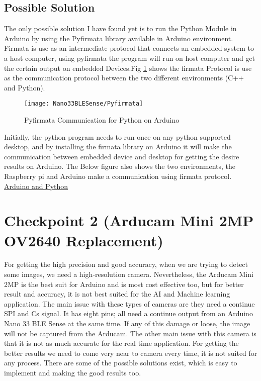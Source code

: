 \subsection{Possible Solution}
The only possible solution I have found yet is to run the Python Module in Arduino by using the Pyfirmata library available in Arduino environment. Firmata is use as an intermediate protocol that connects an embedded system to a host computer, using pyfirmata the program will run on host computer and get the certain output on embedded Devices.Fig \ref{Python and Arduino} shows the firmata Protocol is use as the communication protocol between the two different environments (C++ and Python). 
\begin{figure}[h]
	\centering
	\texttt{[image: Nano33BLESense/Pyfirmata]}
	\caption{Pyfirmata Communication for Python on Arduino}
	\label{Python and Arduino}
\end{figure}
Initially, the python program needs to run once on any python supported desktop, and by installing the firmata library on Arduino it will make the communication between embedded device and desktop for getting the desire results on Arduino. The Below figure also shows the two environments, the Raspberry pi and Arduino make a communication using firmata protocol. \href{https://roboticsbackend.com/control-arduino-with-python-and-pyfirmata-from-raspberry-pi/}{Arduino and Python}
\section{Checkpoint 2 (Arducam Mini 2MP OV2640 Replacement)}
For getting the high precision and good accuracy, when we are trying to detect some images, we need a high-resolution camera. Nevertheless, the Arducam Mini 2MP is the best suit for Arduino and is most cost effective too, but for better result and accuracy, it is not best suited for the AI and Machine learning application. The main issue with these types of cameras are they need a continue SPI and Cs signal. It has eight pins; all need a continue output from an Arduino Nano 33 BLE Sense at the same time. If any of this damage or loose, the image will not be captured from the Arducam. The other main issue with this camera is that it is not as much accurate for the real time application. For getting the better results we need to come very near to camera every time, it is not suited for any process. There are some of the possible solutions exist, which is easy to implement and making the good results too.
